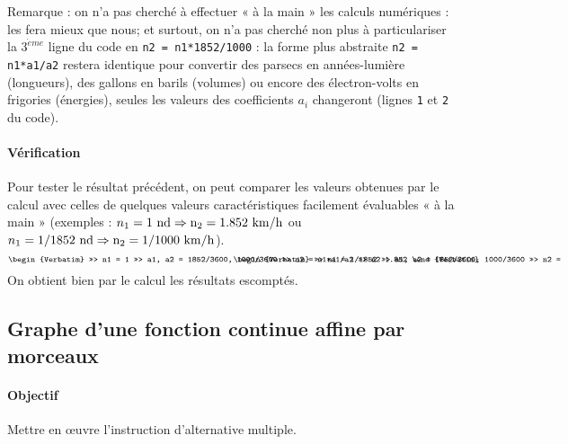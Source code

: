 Remarque : on n'a pas cherché à effectuer « à la main » les calculs numériques :
\python{} les fera mieux que nous; et surtout, on n'a pas cherché non plus à 
particulariser la $3^{\grave eme}$ ligne du code en \texttt{n2 = n1*1852/1000} :
la forme plus abstraite \texttt{n2 = n1*a1/a2} restera identique pour convertir 
des parsecs en années-lumière (longueurs), des gallons en barils (volumes) ou 
encore des électron-volts en frigories (énergies), seules les valeurs des coefficients $a_i$ changeront (lignes \texttt{1} 
et \texttt{2} du code).

\paragraph{Vérification}
Pour tester le résultat précédent, on peut comparer les valeurs obtenues par le calcul 
avec celles de quelques valeurs caractéristiques facilement évaluables « à la main »
(exemples : $n_1 = 1\ \rm{nd} \Rightarrow{} n_2 = 1.852\ \rm{km/h}$ ou
$n_1 = 1/1852\ \rm{nd} \Rightarrow{} n_2 = 1/1000\ \rm{km/h}$).
$$\begin{minipage}[t]{7.5cm}\footnotesize
\begin{Verbatim}
>>> n1 = 1
>>> a1, a2 = 1852/3600, 1000/3600
>>> n2 = n1*a1/a2
>>> n2
1.852
\end{Verbatim}
\end{minipage}
\hfill
\begin{minipage}[t]{7.5cm}\footnotesize
\begin{Verbatim}
>>> n1 = 1/1852
>>> a1, a2 = 1852/3600, 1000/3600
>>> n2 = n1*a1/a2
>>> n2
0.0010000000000000002
\end{Verbatim}
\end{minipage}$$
On obtient bien par le calcul les résultats escomptés.

\subsection{Graphe d'une fonction continue affine par morceaux}\label{subsec:fonction}
\paragraph{Objectif} Mettre en \oe uvre l'instruction d'alternative multiple.


